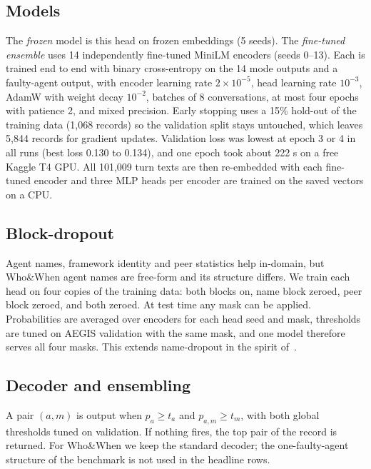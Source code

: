 \documentclass[conference]{IEEEtran}
\begin{document}
\subsection{Models}
The \emph{frozen} model is this head on frozen embeddings (5 seeds). The \emph{fine-tuned ensemble} uses 14 independently fine-tuned MiniLM encoders (seeds 0--13). Each is trained end to end with binary cross-entropy on the 14 mode outputs and a faulty-agent output, with encoder learning rate $2\times10^{-5}$, head learning rate $10^{-3}$, AdamW with weight decay $10^{-2}$, batches of 8 conversations, at most four epochs with patience 2, and mixed precision. Early stopping uses a 15\% hold-out of the training data (1,068 records) so the validation split stays untouched, which leaves 5,844 records for gradient updates. Validation loss was lowest at epoch 3 or 4 in all runs (best loss 0.130 to 0.134), and one epoch took about 222 s on a free Kaggle T4 GPU. All 101,009 turn texts are then re-embedded with each fine-tuned encoder and three MLP heads per encoder are trained on the saved vectors on a CPU.

\subsection{Block-dropout}
Agent names, framework identity and peer statistics help in-domain, but Who\&When agent names are free-form and its structure differs. We train each head on four copies of the training data: both blocks on, name block zeroed, peer block zeroed, and both zeroed. At test time any mask can be applied. Probabilities are averaged over encoders for each head seed and mask, thresholds are tuned on AEGIS validation with the same mask, and one model therefore serves all four masks. This extends name-dropout in the spirit of~\cite{dropout,moddrop}.

\subsection{Decoder and ensembling}
A pair $(a,m)$ is output when $p_a\ge t_a$ and $p_{a,m}\ge t_m$, with both global thresholds tuned on validation. If nothing fires, the top pair of the record is returned. For Who\&When we keep the standard decoder; the one-faulty-agent structure of the benchmark is not used in the headline rows.
\end{document}
